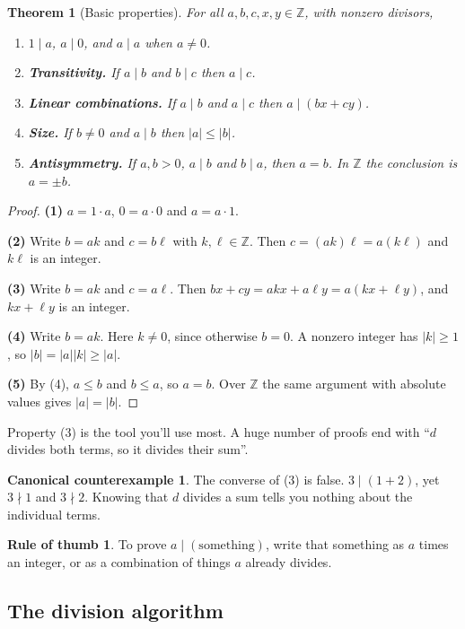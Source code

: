 \documentclass[11pt,a4paper]{article}
\newtheorem{theorem}{Theorem}[section]
\theoremstyle{definition}
\newcommand{\Z}{\mathbb{Z}}
\theoremstyle{noteit}
\theoremstyle{note}
\newtheorem*{counter}{Canonical counterexample}
\newtheorem*{thumbrule}{Rule of thumb}
\begin{document}
\begin{theorem}[Basic properties]
For all $a,b,c,x,y\in\Z$, with nonzero divisors,
\begin{enumerate}
  \item $1\mid a$, $a\mid 0$, and $a\mid a$ when $a\ne 0$.
  \item \textbf{Transitivity.} If $a\mid b$ and $b\mid c$ then $a\mid c$.
  \item \textbf{Linear combinations.} If $a\mid b$ and $a\mid c$ then $a\mid (bx+cy)$.
  \item \textbf{Size.} If $b\ne 0$ and $a\mid b$ then $|a|\le|b|$.
  \item \textbf{Antisymmetry.} If $a,b>0$, $a\mid b$ and $b\mid a$, then $a=b$. In $\Z$ the conclusion is $a=\pm b$.
\end{enumerate}
\end{theorem}

\begin{proof}
\textbf{(1)} $a=1\cdot a$, $0=a\cdot 0$ and $a=a\cdot 1$.

\textbf{(2)} Write $b=ak$ and $c=b\ell$ with $k,\ell\in\Z$. Then $c=(ak)\ell=a(k\ell)$ and $k\ell$ is an integer.

\textbf{(3)} Write $b=ak$ and $c=a\ell$. Then $bx+cy=akx+a\ell y=a(kx+\ell y)$, and $kx+\ell y$ is an integer.

\textbf{(4)} Write $b=ak$. Here $k\ne 0$, since otherwise $b=0$. A nonzero integer has $|k|\ge 1$, so $|b|=|a||k|\ge|a|$.

\textbf{(5)} By (4), $a\le b$ and $b\le a$, so $a=b$. Over $\Z$ the same argument with absolute values gives $|a|=|b|$.
\end{proof}

Property (3) is the tool you'll use most. A huge number of proofs end with ``$d$ divides both terms, so it divides their sum''.

\begin{counter}
The converse of (3) is false. $3\mid (1+2)$, yet $3\nmid 1$ and $3\nmid 2$. Knowing that $d$ divides a sum tells you nothing about the individual terms.
\end{counter}

\begin{thumbrule}
To prove $a\mid(\text{something})$, write that something as $a$ times an integer, or as a combination of things $a$ already divides.
\end{thumbrule}

\subsection{The division algorithm}
\end{document}
